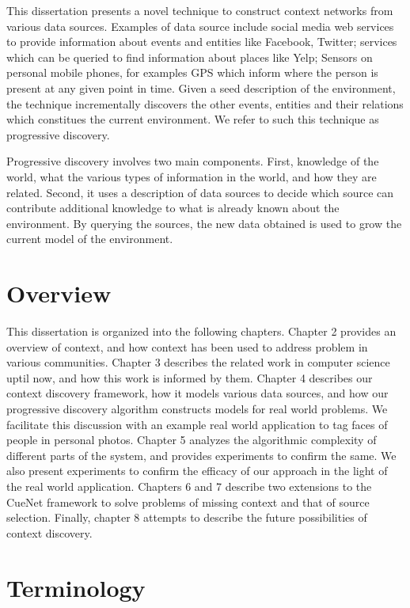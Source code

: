 This dissertation presents a novel technique to construct context networks from various data sources. Examples of data source include social media web services to provide information about events and entities like Facebook, Twitter; services which can be queried to find information about places like Yelp; Sensors on personal mobile phones, for examples GPS which inform where the person is present at any given point in time. Given a seed description of the environment, the technique incrementally discovers the other events, entities and their relations which constitues the current environment. We refer to such this technique as progressive discovery. 

Progressive discovery involves two main components. First, knowledge of the world, what the various types of information in the world, and how they are related. Second, it uses a description of data sources to decide which source can contribute additional knowledge to what is already known about the environment. By querying the sources, the new data obtained is used to grow the current model of the environment. 


\section{Overview}
This dissertation is organized into the following chapters. Chapter 2 provides an overview of context, and how context has been used to address problem in various communities. Chapter 3 describes the related work in computer science uptil now, and how this work is informed by them. Chapter 4 describes our context discovery framework, how it models various data sources, and how our progressive discovery algorithm constructs models for real world problems. We facilitate this discussion with an example real world application to tag faces of people in personal photos. Chapter 5 analyzes the algorithmic complexity of different parts of the system, and provides experiments to confirm the same. We also present experiments to confirm the efficacy of our approach in the light of the real world application. Chapters 6 and 7 describe two extensions to the CueNet framework to solve problems of missing context and that of source selection. Finally, chapter 8 attempts to describe the future possibilities of context discovery.

\section{Terminology}
